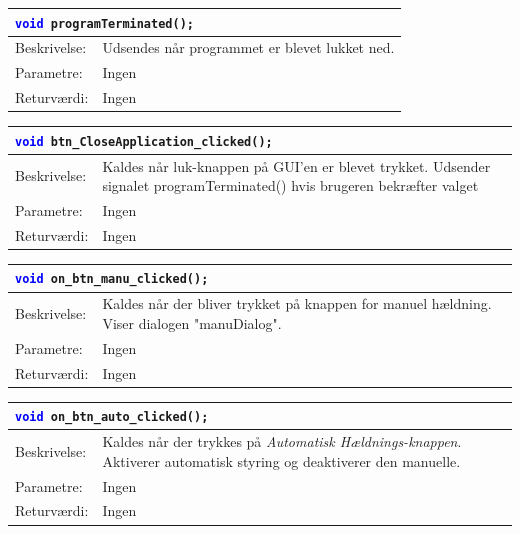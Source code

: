 \begin{table}[H]
\begin{tabular}{l p{12.5cm}}
\multicolumn{2}{l}{\texttt{\textcolor{blue}{void} programTerminated();}} \\
\hline
Beskrivelse:&Udsendes når programmet er blevet lukket ned.\\
Parametre:&Ingen\\
Returværdi:&Ingen\\
\end{tabular}
\end{table}

\begin{table}[H]
\begin{tabular}{l p{12.5cm}}
\multicolumn{2}{l}{\texttt{\textcolor{blue}{void} btn\_CloseApplication\_clicked();}} \\
\hline
Beskrivelse: &Kaldes når luk-knappen på GUI'en er blevet trykket. 
Udsender signalet programTerminated() hvis brugeren bekræfter valget\\
Parametre:&Ingen\\
Returværdi:&Ingen\\
\end{tabular}
\end{table}

\begin{table}[H]
\begin{tabular}{l p{12.5cm}}
\multicolumn{2}{l}{\texttt{\textcolor{blue}{void} on\_btn\_manu\_clicked();}} \\
\hline
Beskrivelse: &Kaldes når der bliver trykket på knappen for manuel hældning. Viser dialogen "manuDialog".\\
Parametre:&Ingen\\
Returværdi:&Ingen\\
\end{tabular}
\end{table}

\begin{table}[H]
\begin{tabular}{l p{12.5cm}}
\multicolumn{2}{l}{\texttt{\textcolor{blue}{void} on\_btn\_auto\_clicked();
}} \\
\hline
Beskrivelse:&Kaldes når der trykkes på \textit{Automatisk Hældnings-knappen}. Aktiverer automatisk styring og deaktiverer den manuelle.\\
Parametre:&Ingen\\
Returværdi:&Ingen\\
\end{tabular}
\end{table}

